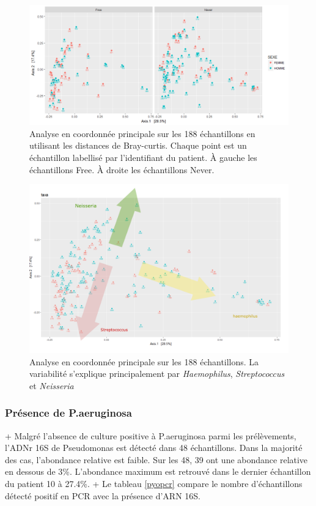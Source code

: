 \documentclass[12pt,a4paper]{article}
\begin{document}
\begin{figure}
\begin{center}
\includegraphics[scale=0.60]{img/oordination_new.png}\hfill
\end{center}
\caption{Analyse en coordonnée principale sur les 188 échantillons en utilisant les distances de Bray-curtis. Chaque point est un échantillon labellisé par l'identifiant du patient. À gauche les échantillons Free. À droite les échantillons Never. }
\label{ordination}
\end{figure}

\begin{figure}
\begin{center}
\includegraphics[scale=0.40]{img/Capture.png}\hfill
\end{center}
\caption{Analyse en coordonnée principale sur les 188 échantillons. La variabilité s'explique principalement par \textit{Haemophilus}, \textit{Streptococcus} et \textit{Neisseria}}
\label{ordination2}
\end{figure}

\subsubsection{Présence de P.aeruginosa}
 + Malgré l'absence de culture positive à P.aeruginosa parmi les prélèvements, l'ADNr 16S de Pseudomonas est détecté dans 48 échantillons. Dans la majorité des cas, l'abondance relative est faible. Sur les 48, 39 ont une abondance relative en dessous de 3\%. L'abondance maximum est retrouvé dans le dernier échantillon du patient 10 à 27.4\%. 
 + Le tableau \ref{pyopcr} compare le nombre d'échantillons détecté positif en PCR avec la présence d'ARN 16S. 
  
\end{document}
